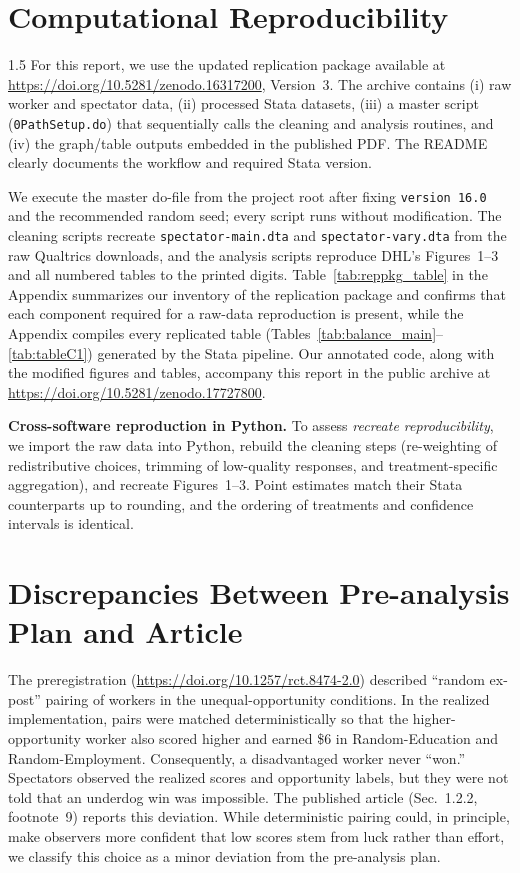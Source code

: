 \documentclass[12pt,a4paper]{article}
\begin{document}
\section{Computational Reproducibility}


\begin{spacing}{1.5}
For this report, we use the updated replication package available at \url{https://doi.org/10.5281/zenodo.16317200}, Version~3. The archive contains (i) raw worker and spectator data, (ii) processed Stata datasets, (iii) a master script (\texttt{0PathSetup.do}) that sequentially calls the cleaning and analysis routines, and (iv) the graph/table outputs embedded in the published PDF. The README clearly documents the workflow and required Stata version.

We execute the master do-file from the project root after fixing \texttt{version 16.0} and the recommended random seed; every script runs without modification. The cleaning scripts recreate \texttt{spectator-main.dta} and \texttt{spectator-vary.dta} from the raw Qualtrics downloads, and the analysis scripts reproduce DHL's Figures~1--3 and all numbered tables to the printed digits. Table~\ref{tab:reppkg_table} in the Appendix summarizes our inventory of the replication package and confirms that each component required for a raw-data reproduction is present, while the Appendix compiles every replicated table (Tables~\ref{tab:balance_main}--\ref{tab:tableC1}) generated by the Stata pipeline. Our annotated code, along with the modified figures and tables, accompany this report in the public archive at \url{https://doi.org/10.5281/zenodo.17727800}.

\medskip
\noindent\textbf{Cross-software reproduction in Python.}
To assess \emph{recreate reproducibility}, we import the raw data into Python, rebuild the cleaning steps (re-weighting of redistributive choices, trimming of low-quality responses, and treatment-specific aggregation), and recreate Figures~1--3. Point estimates match their Stata counterparts up to rounding, and the ordering of treatments and confidence intervals is identical.

\section{Discrepancies Between Pre-analysis Plan and Article}


The preregistration (\url{https://doi.org/10.1257/rct.8474-2.0}) described “random ex-post” pairing of workers in the unequal-opportunity conditions. In the realized implementation, pairs were matched deterministically so that the higher-opportunity worker also scored higher and earned \$6 in Random-Education and Random-Employment. Consequently, a disadvantaged worker never “won.” Spectators observed the realized scores and opportunity labels, but they were not told that an underdog win was impossible. The published article (Sec.~1.2.2, footnote~9) reports this deviation. While deterministic pairing could, in principle, make observers more confident that low scores stem from luck rather than effort, we classify this choice as a minor deviation from the pre-analysis plan.

\end{spacing}
\end{document}

